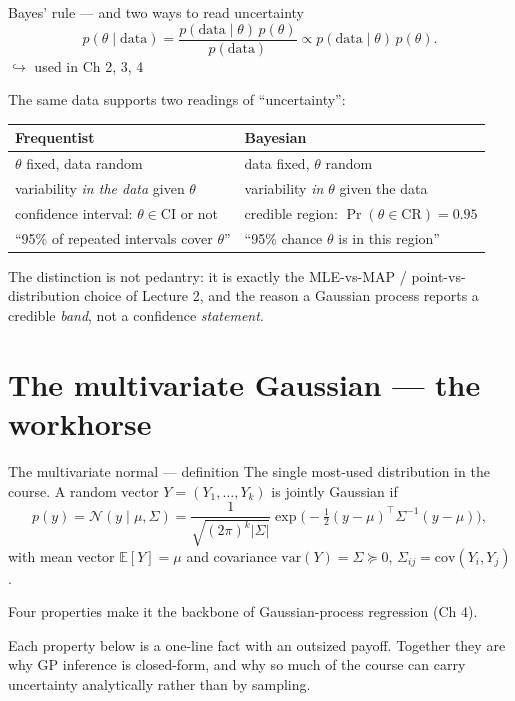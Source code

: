 \documentclass[10pt, aspectratio=169]{beamer}
\newcommand{\usedin}[1]{\hfill{\footnotesize\textcolor{mDarkTeal}{$\hookrightarrow$ used in #1}}}
\begin{document}
\begin{frame}{Bayes' rule --- and two ways to read uncertainty}
\[
p(\theta\mid \text{data}) = \frac{p(\text{data}\mid\theta)\,p(\theta)}{p(\text{data})} \propto p(\text{data}\mid\theta)\,p(\theta).
\]
\usedin{Ch 2, 3, 4}
\medskip

\pause
The same data supports two readings of ``uncertainty'':
\begin{center}\footnotesize\renewcommand{\arraystretch}{1.4}
\begin{tabular}{l|l}
\textbf{Frequentist} & \textbf{Bayesian} \\
\hline
$\theta$ fixed, data random & data fixed, $\theta$ random \\
variability \emph{in the data} given $\theta$ & variability \emph{in $\theta$} given the data \\
confidence interval: $\theta\in\mathrm{CI}$ or not & credible region: $\Pr(\theta\in\mathrm{CR})=0.95$ \\
``95\% of repeated intervals cover $\theta$'' & ``95\% chance $\theta$ is in this region'' \\
\end{tabular}
\end{center}
\medskip

\pause
The distinction is not pedantry: it is exactly the MLE-vs-MAP / point-vs-distribution choice of Lecture 2, and the reason a Gaussian process reports a credible \emph{band}, not a confidence \emph{statement}.
\end{frame}

\section{The multivariate Gaussian --- the workhorse}

\begin{frame}{The multivariate normal --- definition}
The single most-used distribution in the course. A random vector $Y=(Y_1,\dots,Y_k)$ is jointly Gaussian if
\[
p(y) = \mathcal{N}(y\mid \mu, \Sigma) = \frac{1}{\sqrt{(2\pi)^k|\Sigma|}}\exp\!\Big(-\tfrac12 (y-\mu)^\top \Sigma^{-1}(y-\mu)\Big),
\]
with mean vector $\mathbb{E}[Y]=\mu$ and covariance $\mathrm{var}(Y)=\Sigma\succeq0$, $\Sigma_{ij}=\mathrm{cov}(Y_i,Y_j)$.
\medskip

\pause
\begin{center}\large
Four properties make it the backbone of \alert{Gaussian-process regression} (Ch 4).
\end{center}
\medskip
Each property below is a one-line fact with an outsized payoff. Together they are why GP inference is closed-form, and why so much of the course can carry uncertainty analytically rather than by sampling.
\end{frame}
\end{document}
